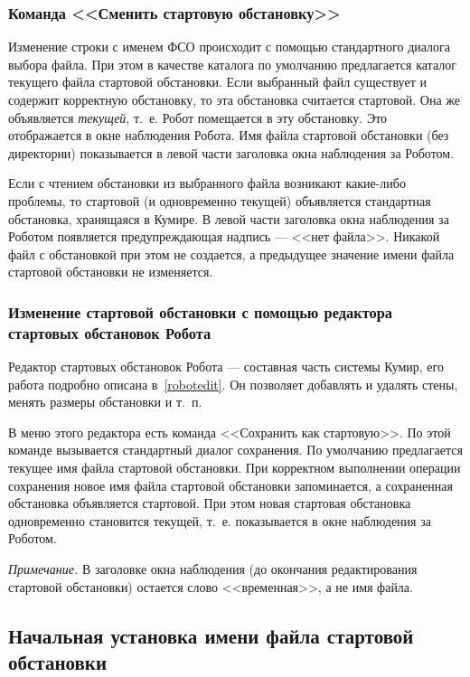 \documentclass[12pt,a4paper]{article}
\begin{document}
\subsubsection[Команда ''Сменить стартовую обстановку'']{Команда <<Сменить стартовую обстановку>>}

Изменение строки с именем ФСО происходит с помощью стандартного диалога выбора файла. При этом в качестве каталога по умолчанию предлагается каталог текущего файла стартовой обстановки. Если выбранный файл существует и содержит корректную обстановку, то эта обстановка считается стартовой. Она же объявляется \emph{текущей}, т.~е. Робот помещается в эту обстановку. Это отображается в окне наблюдения Робота. Имя файла стартовой обстановки (без директории) показывается в левой части заголовка окна наблюдения за Роботом.

Если с чтением обстановки из выбранного файла возникают какие-либо проблемы, то стартовой (и одновременно текущей) объявляется стандартная обстановка, хранящаяся в Кумире. В левой части заголовка окна наблюдения за Роботом появляется предупреждающая надпись --- <<нет файла>>. Никакой файл с обстановкой при этом не создается, а предыдущее значение имени файла стартовой обстановки не изменяется.

\subsubsection{Изменение стартовой обстановки с помощью редактора стартовых обстановок Робота}

Редактор стартовых обстановок Робота --- составная часть системы Кумир, его работа подробно описана в~\ref{robotedit}. Он позволяет добавлять и удалять стены, менять размеры обстановки и т.~п.

В меню этого редактора есть команда <<Сохранить как стартовую>>. По этой команде вызывается стандартный диалог сохранения. По умолчанию предлагается текущее имя файла стартовой обстановки.  При корректном выполнении операции сохранения новое имя файла стартовой обстановки запоминается, а сохраненная обстановка объявляется стартовой. При этом новая стартовая обстановка одновременно становится текущей, т.~е. показывается в окне наблюдения за Роботом.

\emph{Примечание.} В заголовке окна наблюдения (до окончания  редактирования стартовой обстановки) остается слово <<временная>>, а не имя файла.

\subsection{Начальная установка имени файла стартовой обстановки}
\end{document}
